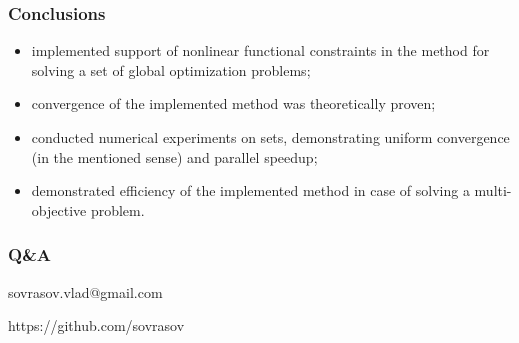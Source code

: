 \documentclass[aspectratio=1610]{beamer}
\newcommand\unnumbered{\setbeamertemplate{footline}{}}
\begin{document}
\begin{frame}
  \frametitle{Conclusions}
    \begin{itemize}
      \item implemented support of nonlinear functional constraints in the method
      for solving a set of global optimization problems;
      \item convergence of the implemented method was theoretically proven;
      \item conducted numerical experiments on sets, demonstrating uniform convergence (in the mentioned sense) and
      parallel speedup;
      \item demonstrated efficiency of the implemented method in case of solving a multi-objective problem.
    \end{itemize}
\end{frame}

{
\unnumbered
\begin{frame}{{}}
  \frametitle{Q\&A}
  \begin{center}
\vspace{0.5cm}

    sovrasov.vlad@gmail.com

    https://github.com/sovrasov
  \end{center}
\end{frame}
}
\end{document}
